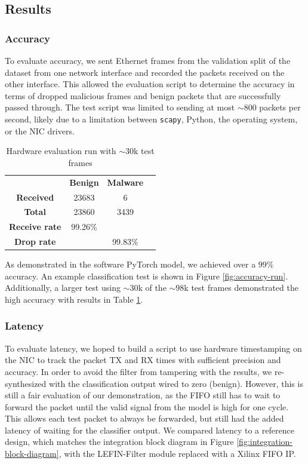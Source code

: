 \documentclass[conference]{IEEEtran}
\begin{document}
\subsection{Results}
\subsubsection{Accuracy}
To evaluate accuracy, we sent Ethernet frames from the
validation split of the dataset from one network interface
and recorded the packets received on the other interface.
This allowed the evaluation script to determine the accuracy
in terms of dropped malicious frames and benign packets
that are successfully passed through.
The test script was limited to sending at most $\sim800$ packets
per second, likely due to a limitation between
\texttt{scapy}, Python, the operating system, or the NIC drivers.

\begin{table}[t]
    \centering
    \begin{tabular}{cccc}
                              & \textbf{Benign} & \textbf{Malware} \\
        \textbf{Received}     & 23683           & 6                \\
        \textbf{Total}        & 23860           & 3439             \\
        \textbf{Receive rate} & 99.26\%         &                  \\
        \textbf{Drop rate}    &                 & 99.83\%
    \end{tabular}
    \caption{Hardware evaluation run with $\sim30$k test frames}
    \label{tab:results-accuracy}
\end{table}

As demonstrated in the software PyTorch model,
we achieved over a $99\%$ accuracy.
An example classification test is shown in Figure \ref{fig:accuracy-run}.
Additionally, a larger test using $\sim30$k of the $\sim98$k test frames
demonstrated the high accuracy with results in Table \ref{tab:results-accuracy}.

\subsubsection{Latency}
To evaluate latency, we hoped to build a script to use
hardware timestamping on the NIC to track the packet TX
and RX times with sufficient precision and accuracy.
In order to avoid the filter from tampering with the results,
we re-synthesized with the classification output wired to zero (benign).
However, this is still a fair evaluation of our demonstration,
as the FIFO still has to wait to forward the packet until the valid
signal from the model is high for one cycle.
This allows each test packet to always be forwarded,
but still had the added latency of waiting for the classifier output.
We compared latency to a reference design,
which matches the integration block diagram
in Figure \ref{fig:integration-block-diagram},
with the LEFIN-Filter module replaced with a Xilinx FIFO IP.
\end{document}
